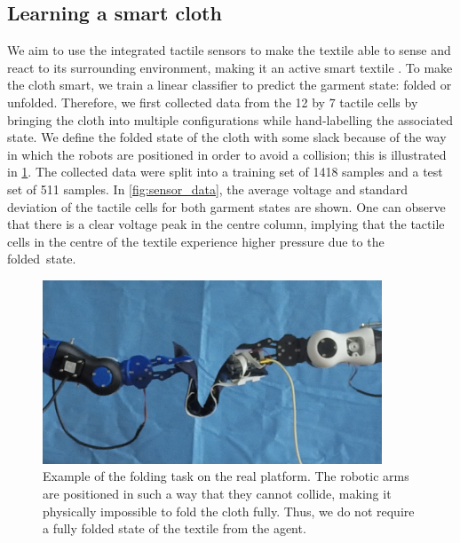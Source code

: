 \documentclass[\home/main.tex]{subfiles}
\begin{document}
\subsection{Learning a smart cloth}
We aim to use the integrated tactile sensors to make the textile able to sense and react to its surrounding environment, making it an active smart textile \autocite{Stoppa2014}. To make the cloth smart, we train a linear classifier to predict the garment state: folded or unfolded. Therefore, we first collected data from the 12 by 7 tactile cells by bringing the cloth into multiple configurations while hand-labelling the associated state. We define the folded state of the cloth with some slack because of the way in which the robots are positioned in order to avoid a collision; this is illustrated in \cref{fig:folded_real}. The collected data were split into a training set of \qty{1418}{} samples and a test set of 511 samples. In \cref{fig:sensor_data}, the average voltage and standard deviation of the tactile cells for both garment states are shown. One can observe that there is a clear voltage peak in the centre column, implying that the tactile cells in the centre of the textile experience higher pressure due to the folded~state.

\begin{figure}[htpb]
    \centering
    \includegraphics[width=0.90\textwidth, keepaspectratio]{figures/folded_real.png}
    \caption[Example of the folding task on the real platform.]{Example of the folding task on the real platform. The robotic arms are positioned in such a way that they cannot collide, making it physically impossible to fold the cloth fully. Thus, we do not require a fully folded state of the textile from the agent.}
    \label{fig:folded_real}
\end{figure}
\end{document}
